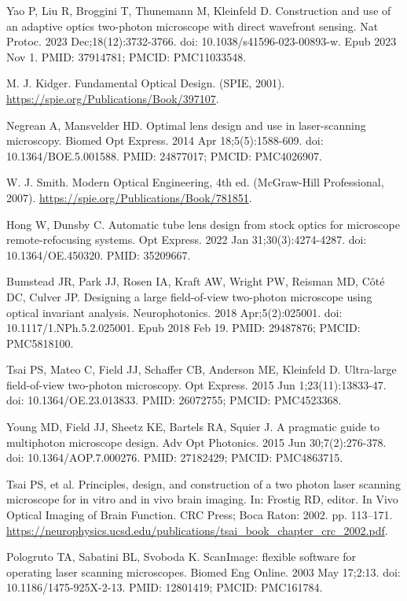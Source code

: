 \documentclass[10pt,letterpaper]{article}
\begin{document}
\begin{thebibliography}{10}
Yao P, Liu R, Broggini T, Thunemann M, Kleinfeld D. Construction and use of an adaptive optics two-photon microscope with direct wavefront sensing. Nat Protoc. 2023 Dec;18(12):3732-3766. doi: 10.1038/s41596-023-00893-w. Epub 2023 Nov 1. PMID: 37914781; PMCID: PMC11033548.

M. J. Kidger. Fundamental Optical Design. (SPIE, 2001). \url{https://spie.org/Publications/Book/397107}.

Negrean A, Mansvelder HD. Optimal lens design and use in laser-scanning microscopy. Biomed Opt Express. 2014 Apr 18;5(5):1588-609. doi: 10.1364/BOE.5.001588. PMID: 24877017; PMCID: PMC4026907.

W. J. Smith. Modern Optical Engineering, 4th ed. (McGraw-Hill Professional, 2007). \url{https://spie.org/Publications/Book/781851}.

Hong W, Dunsby C. Automatic tube lens design from stock optics for microscope remote-refocusing systems. Opt Express. 2022 Jan 31;30(3):4274-4287. doi: 10.1364/OE.450320. PMID: 35209667.

Bumstead JR, Park JJ, Rosen IA, Kraft AW, Wright PW, Reisman MD, Côté DC, Culver JP. Designing a large field-of-view two-photon microscope using optical invariant analysis. Neurophotonics. 2018 Apr;5(2):025001. doi: 10.1117/1.NPh.5.2.025001. Epub 2018 Feb 19. PMID: 29487876; PMCID: PMC5818100.

Tsai PS, Mateo C, Field JJ, Schaffer CB, Anderson ME, Kleinfeld D. Ultra-large field-of-view two-photon microscopy. Opt Express. 2015 Jun 1;23(11):13833-47. doi: 10.1364/OE.23.013833. PMID: 26072755; PMCID: PMC4523368.

Young MD, Field JJ, Sheetz KE, Bartels RA, Squier J. A pragmatic guide to multiphoton microscope design. Adv Opt Photonics. 2015 Jun 30;7(2):276-378. doi: 10.1364/AOP.7.000276. PMID: 27182429; PMCID: PMC4863715.

Tsai PS, et al. Principles, design, and construction of a two photon laser scanning microscope for in vitro and in vivo brain imaging. In: Frostig RD, editor. In Vivo Optical Imaging of Brain Function. CRC Press; Boca Raton: 2002. pp. 113–171. \url{https://neurophysics.ucsd.edu/publications/tsai_book_chapter_crc_2002.pdf}.

Pologruto TA, Sabatini BL, Svoboda K. ScanImage: flexible software for operating laser scanning microscopes. Biomed Eng Online. 2003 May 17;2:13. doi: 10.1186/1475-925X-2-13. PMID: 12801419; PMCID: PMC161784.


\end{thebibliography}
\end{document}
